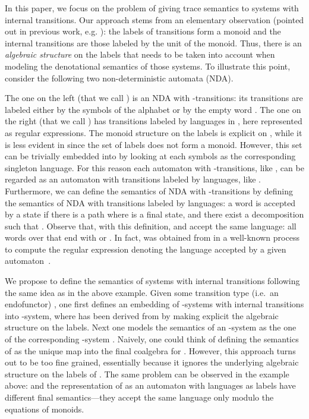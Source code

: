 \documentclass[oribibl,envcountsame,envcountsect,runningheads]{llncs}
\renewcommand{\>}{\rangle}
\begin{document}
In this paper, we focus on the problem of giving trace semantics to systems with internal transitions.
Our approach stems from an elementary observation (pointed out in previous work, e.g. \cite{Sobocinski2012}): the labels of transitions form a monoid and the internal transitions are those labeled by the unit of the monoid. Thus, there is an \emph{algebraic structure} on the labels that needs to be taken into account when modeling the denotational semantics of those systems.
To illustrate this point, consider the following two non-deterministic automata (NDA).

The one on the left (that we call ) is an NDA with -transitions: its transitions are labeled either by the symbols of the alphabet  or by the empty word . The one on the right (that we call ) has transitions labeled by languages in , here represented as regular expressions.
The monoid structure on the labels is explicit on , while it is less evident in  since the set of labels  does not form a monoid. However, this set can be trivially embedded into  by looking at each symbols as the corresponding singleton language. For this reason each automaton with -transitions, like , can be regarded as an automaton with transitions labeled by languages, like . Furthermore, we can define the semantics of NDA with -transitions by defining the semantics of NDA with transitions labeled by languages: a word  is accepted by a state  if there is a path  where  is a final state, and there exist a decomposition  such that .
Observe that, with this definition,  and  accept the same language: all words over  that end with  or . In fact,  was obtained from  in a well-known process to compute the regular expression denoting the language accepted by a given automaton~\cite{Hopcroft}.

We propose to define the semantics of systems with internal transitions following the same idea as in the above example. Given some transition type (i.e.~an endofunctor) , one first defines an embedding of -systems with internal transitions into -system, where  has been derived from  by making explicit the algebraic structure on the labels. Next one models the semantics of an -system as the one of the corresponding -system . Naively, one could think of defining the semantics of  as the unique map  into the final coalgebra for . However, this approach turns out to be too fine grained, essentially because it ignores the underlying algebraic structure on the labels of . The same problem can be observed in the example above:  and the representation of  as an automaton with languages as labels have different final semantics---they accept the same language only modulo the equations of monoids.
\end{document}
